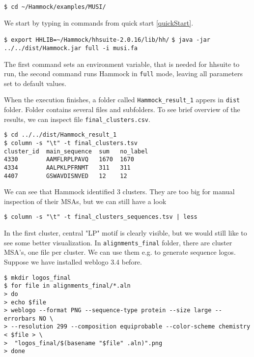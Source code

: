 \documentclass[11pt, a4paper, twoside, titlepage]{article}
\begin{document}
\noindent
\texttt{\$ cd \textasciitilde/Hammock/examples/MUSI/}\newline

We start by typing in commands from quick start \ref{quickStart}.\newline

\noindent
\texttt{\$ export HHLIB=\textasciitilde/Hammock/hhsuite-2.0.16/lib/hh/}\newline
\texttt{\$ java -jar ../../dist/Hammock.jar full -i musi.fa}\newline

The first command sets an environment variable, that is needed for hhsuite to run, the second command runs Hammock in \texttt{full} mode, leaving all parameters set to default values.

When the execution finishes, a folder called \texttt{Hammock\_result\_1} appers in \texttt{dist} folder. Folder contains several files and subfolders. To see brief overview of the results, we can inspect file \texttt{final\_clusters.csv}.\newline

\begin{verbatim}
$ cd ../../dist/Hammock_result_1
$ column -s "\t" -t final_clusters.tsv
cluster_id  main_sequence  sum   no_label
4330        AAMFLRPLPAVQ   1670  1670
4334        AALPKLPFRNMT   311   311
4407        GSWAVDISNVED   12    12
\end{verbatim}

We can see that Hammock identified 3 clusters. They are too big for manual inspection of their MSAs, but we can still have a look

\begin{verbatim}
$ column -s "\t" -t final_clusters_sequences.tsv | less
\end{verbatim}

In the first cluster, central "LP" motif is clearly visible, but we would still like to see some better visualization. In \texttt{alignments\_final} folder, there are cluster MSA's, one file per cluster. We can use them e.g. to generate sequence logos. Suppose we have installed weblogo 3.4 \cite{Crooks2004} before.

\begin{verbatim}
$ mkdir logos_final
$ for file in alignments_final/*.aln
> do
> echo $file
> weblogo --format PNG --sequence-type protein --size large --errorbars NO \ 
> --resolution 299 --composition equiprobable --color-scheme chemistry < $file > \
>  "logos_final/$(basename "$file" .aln)".png
> done 
\end{verbatim}
\end{document}
